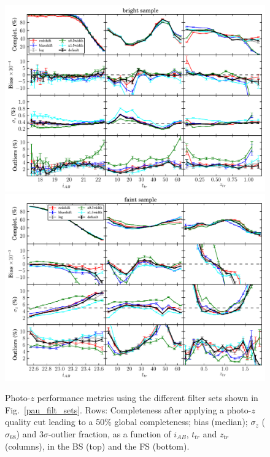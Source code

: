 \begin{figure}
\centering
\includegraphics[type=pdf,ext=.pdf,read=.pdf, width=130mm]{./plots/mock.r260.n1e6.s10.121027_bright_filt_sets_compar} \\
\includegraphics[type=pdf,ext=.pdf,read=.pdf, width=130mm]{./plots/mock.r260.n1e6.s10.121027_faint_filt_sets_compar}
\caption{Photo-$z$ performance metrics using the different filter sets shown in Fig.~\ref{pau_filt_sets}. Rows: Completeness after applying a photo-$z$ quality cut leading to a 50\% global completeness; bias (median); $\sigma_z$ ($\sigma_{68}$) and 3$\sigma$-outlier fraction, as a function of $i_{AB}$, $t_{tr}$ and $z_{tr}$ (columns), in the BS (top) and the FS (bottom).}
\label{pz_results_filt_sets}
\end{figure}

